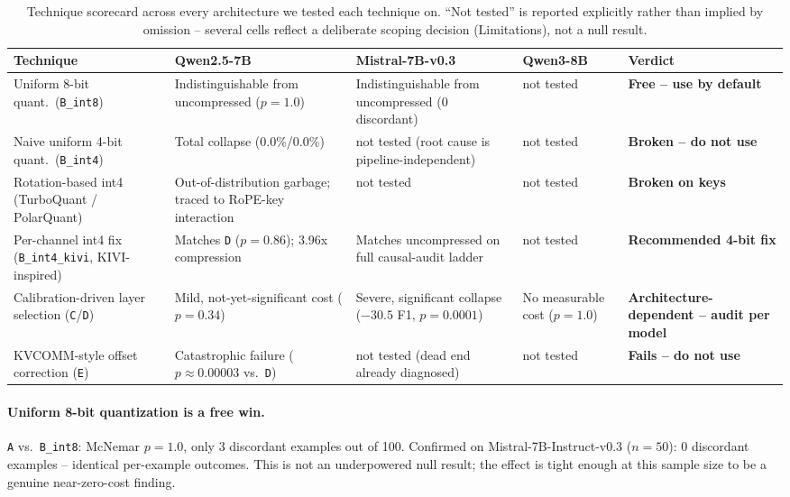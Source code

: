 \documentclass[11pt]{article}
\begin{document}
\begin{table}[t]
\centering
\footnotesize
\setlength{\tabcolsep}{4pt}
\begin{tabular}{p{2.9cm}p{2.8cm}p{2.8cm}p{2.0cm}p{2.9cm}}
\toprule
\textbf{Technique} & \textbf{Qwen2.5-7B} & \textbf{Mistral-7B-v0.3} & \textbf{Qwen3-8B} & \textbf{Verdict} \\
\midrule
Uniform 8-bit quant.\ (\texttt{B\_int8}) & Indistinguishable from uncompressed ($p=1.0$) & Indistinguishable from uncompressed (0 discordant) & not tested & \textbf{Free -- use by default} \\
Naive uniform 4-bit quant.\ (\texttt{B\_int4}) & Total collapse (0.0\%/0.0\%) & not tested (root cause is pipeline-independent) & not tested & \textbf{Broken -- do not use} \\
Rotation-based int4 (TurboQuant / PolarQuant) & Out-of-distribution garbage; traced to RoPE-key interaction & not tested & not tested & \textbf{Broken on keys} \\
Per-channel int4 fix (\texttt{B\_int4\_kivi}, KIVI-inspired) & Matches \texttt{D} ($p=0.86$); 3.96x compression & Matches uncompressed on full causal-audit ladder & not tested & \textbf{Recommended 4-bit fix} \\
Calibration-driven layer selection (\texttt{C}/\texttt{D}) & Mild, not-yet-significant cost ($p=0.34$) & Severe, significant collapse ($-30.5$ F1, $p=0.0001$) & No measurable cost ($p=1.0$) & \textbf{Architecture-dependent -- audit per model} \\
KVCOMM-style offset correction (\texttt{E}) & Catastrophic failure ($p\approx0.00003$ vs.\ \texttt{D}) & not tested (dead end already diagnosed) & not tested & \textbf{Fails -- do not use} \\
\bottomrule
\end{tabular}
\caption{Technique scorecard across every architecture we tested each
technique on. ``Not tested'' is reported explicitly rather than implied
by omission -- several cells reflect a deliberate scoping decision
(Limitations), not a null result.}
\label{tab:scorecard}
\end{table}

\paragraph{Uniform 8-bit quantization is a free win.} \texttt{A} vs.\
\texttt{B\_int8}: McNemar $p=1.0$, only 3 discordant examples out of 100.
Confirmed on Mistral-7B-Instruct-v0.3 ($n=50$): 0 discordant examples --
identical per-example outcomes. This is not an underpowered null result;
the effect is tight enough at this sample size to be a genuine
near-zero-cost finding.
\end{document}
